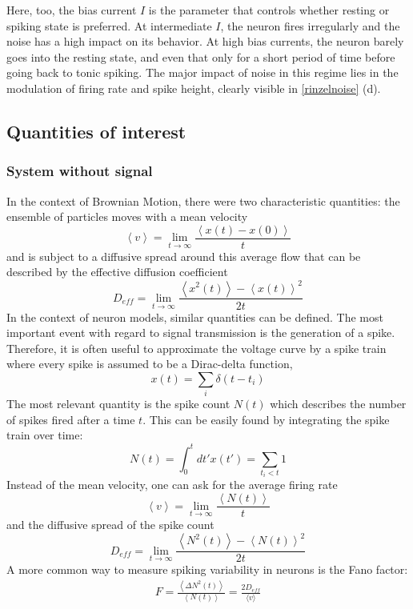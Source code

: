\documentclass[12pt,a4paper]{article}
\begin{document}
Here, too, the bias current $I$ is the parameter that controls whether resting or spiking state is preferred. At intermediate $I$, the neuron fires irregularly and the noise has a high impact on its behavior. At high bias currents, the neuron barely goes into the resting state, and even that only for a short period of time before going back to tonic spiking. The major impact of noise in this regime lies in the modulation of firing rate and spike height, clearly visible in \ref{rinzelnoise} (d).
\subsection{Quantities of interest}
\subsubsection{System without signal}
In the context of Brownian Motion, there were two characteristic quantities: the ensemble of particles moves with a mean velocity
\begin{equation}
\left\langle v\right\rangle =\lim_{t\rightarrow\infty}\frac{\left\langle x(t)-x(0) \right\rangle}{t}
\end{equation}
and is subject to a diffusive spread around this average flow that can be described by the effective diffusion coefficient
\begin{equation}
D_{eff}=\lim_{t\rightarrow\infty}\frac{\left\langle x^2(t) \right\rangle-\left\langle x(t)\right\rangle ^2}{2t}
\end{equation}
In the context of neuron models, similar quantities can be defined. The most important event with regard to signal transmission is the generation of a spike. Therefore, it is often useful to approximate the voltage curve by a spike train where every spike is assumed to be a Dirac-delta function,
\begin{equation}
x(t)=\sum_{i}\delta(t-t_i)
\end{equation}
The most relevant quantity is the spike count $N(t)$ which describes the number of spikes fired after a time $t$. This can be easily found by integrating the spike train over time:
\begin{equation}
N(t)=\int_{0}^{t}dt'x(t')=\sum_{t_i<t} 1
\end{equation}
Instead of the mean velocity, one can ask for the average firing rate
\begin{equation}
\left\langle v\right\rangle =\lim_{t\rightarrow\infty}\frac{\left\langle N(t) \right\rangle}{t}
\end{equation} 
and the diffusive spread of the spike count
\begin{equation}
D_{eff}=\lim_{t\rightarrow\infty}\frac{\left\langle N^2(t) \right\rangle-\left\langle N(t)\right\rangle ^2}{2t}
\end{equation}
A more common way to measure spiking variability in neurons is the Fano factor:
\begin{align*}
F=\frac{\left\langle \Delta N^2(t) \right\rangle}{\left\langle N(t)\right\rangle}=\frac{2D_{eff}}{\langle v\rangle}
\end{align*}
\end{document}

